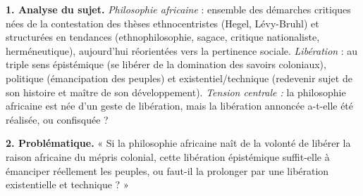 \documentclass[11pt]{article}
\begin{document}
\begin{corrige}
\textbf{1. Analyse du sujet.} \emph{Philosophie africaine} : ensemble des démarches critiques nées de la contestation des thèses ethnocentristes (Hegel, Lévy-Bruhl) et structurées en tendances (ethnophilosophie, sagace, critique nationaliste, herméneutique), aujourd'hui réorientées vers la pertinence sociale. \emph{Libération} : au triple sens épistémique (se libérer de la domination des savoirs coloniaux), politique (émancipation des peuples) et existentiel/technique (redevenir sujet de son histoire et maître de son développement). \emph{Tension centrale :} la philosophie africaine est née d'un geste de libération, mais la libération annoncée a-t-elle été réalisée, ou confisquée ?

\textbf{2. Problématique.} « Si la philosophie africaine naît de la volonté de libérer la raison africaine du mépris colonial, cette libération épistémique suffit-elle à émanciper réellement les peuples, ou faut-il la prolonger par une libération existentielle et technique ? »


\end{corrige}
\end{document}
